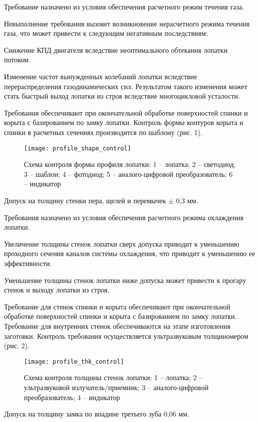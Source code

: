 Требование назначено из условия обеспечения расчетного режим течения газа.

Невыполнение требования вызовет возникновение нерасчетного режима течения газа, что может привести к следующим негативным последствиям:

Снижение КПД двигателя вследствие неоптимального обтекания лопатки потоком.

Изменение частот вынужденных колебаний лопатки вследствие перераспределения газодинамических сил. Результатом такого изменения может стать быстрый выход лопатки из строя вследствие многоцикловой усталости.

Требования обеспечивают при окончательной обработке поверхностей спинки и корыта с базированием по замку лопатки.
Контроль формы контуров корыта и спинки в расчетных сечениях производится по шаблону (рис. 1).

\begin{figure}[H]
    \centering
    \texttt{[image: profile\_shape\_control]}
    \caption{Схема контроля формы профиля лопатки: 1 – лопатка; 2 – светодиод; 3 – шаблон; 4 – фотодиод; 5 – аналого-цифровой преобразователь; 6 – индикатор}
\end{figure}

Допуск на  толщину стенки пера, щелей и перемычек $\pm$ 0,3 мм.

Требования назначено из условия обеспечения расчетного режима охлаждения лопатки.

Увеличение толщины стенок лопатки сверх допуска приводит к уменьшению проходного сечения каналов системы охлаждения, что приводит к уменьшению ее эффективности.

Уменьшение толщины стенок лопатки ниже допуска может привести к прогару стенок и выходу лопатки из строя.

Требование для стенок спинки и корыта обеспечивают при окончательной обработке поверхностей спинки и корыта с базированием по замку лопатки. Требование для внутренних стенок обеспечиваются на этапе изготовления заготовки.
Контроль требования осуществляется ультразвуковым толщиномером (рис. 2).

\begin{figure}[H]
    \centering
    \texttt{[image: profile\_thk\_control]}
    \caption{Схема контроля толщины стенок лопатки: 1 – лопатка; 2 – ультразвуковой излучатель/приемник; 3 – аналого-цифровой преобразователь; 4 – индикатор}
\end{figure}

Допуск на толщину замка по впадине третьего зуба 0,06 мм.


